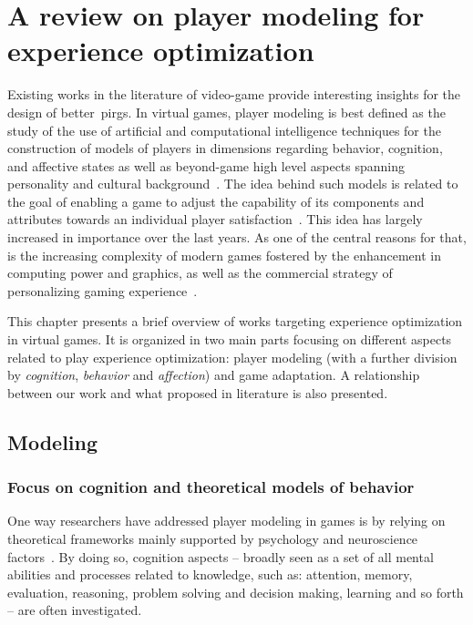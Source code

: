 \chapter{A review on player modeling for experience optimization}\label{ch:review_playing_optimization}
Existing works in the literature of video-game provide interesting insights for the design of better~\glspl{pirg}. In virtual games, player modeling is best defined as the study of the use of artificial and computational intelligence techniques for the construction of models of players in dimensions regarding behavior, cognition, and affective states as well as beyond-game high level aspects spanning personality and cultural background~\citep{yannakakis_player_2013}. The idea behind such models is related to the goal of enabling a game to adjust the capability of its components and attributes towards an individual player satisfaction~\citep{herik_opponent_2005}. This idea has largely increased in importance over the last years. As one of the central reasons for that, is the increasing complexity of modern games fostered by the enhancement in computing power and graphics, as well as the commercial strategy of personalizing gaming experience~\citep{teng_customization_2010, herik_opponent_2005}. 

This chapter presents a brief overview of works targeting experience optimization in virtual games. It is organized in two main parts focusing on different aspects related to play experience optimization: player modeling (with a further division by \textit{cognition}, \textit{behavior} and \textit{affection}) and game adaptation. A relationship between our work and what proposed in literature is also presented.

\section{Modeling}
\subsection{Focus on cognition and theoretical models of behavior}
One way researchers have addressed player modeling in games is by relying on theoretical frameworks mainly supported by psychology and neuroscience factors~\citep{yannakakis_player_2013}. By doing so, cognition aspects -- broadly seen as a set of all mental abilities and processes related to knowledge, such as: attention, memory, evaluation, reasoning, problem solving and decision making, learning and so forth -- are often investigated. 

